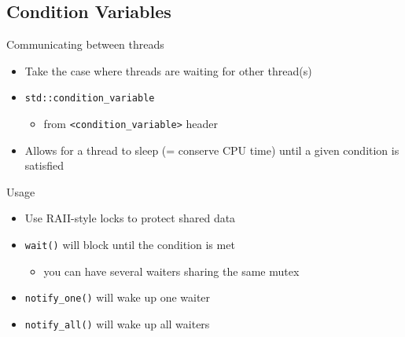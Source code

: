 \subsection[condition]{Condition Variables}

\begin{frame}[fragile]
  \begin{block}{Communicating between threads}
    \begin{itemize}
      \item Take the case where threads are waiting for other thread(s)
      \item \texttt{std::condition_variable}
      \begin{itemize}
        \item from \texttt{<condition_variable>} header
      \end{itemize}
      \item Allows for a thread to sleep (= conserve CPU time) until a given condition is satisfied
    \end{itemize}
  \end{block}
  \pause
  \begin{block}{Usage}
    \begin{itemize}
    \item Use RAII-style locks to protect shared data
    \item \texttt{wait()} will block until the condition is met
      \begin{itemize}
      \item you can have several waiters sharing the same mutex
      \end{itemize}
    \item \texttt{notify_one()} will wake up one waiter
    \item \texttt{notify_all()} will wake up all waiters
    \end{itemize}
  \end{block}
\end{frame}

